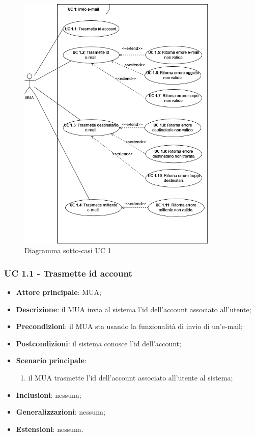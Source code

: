    \begin{figure}[H]
        \includegraphics[width=0.85\textwidth]{sections/uc_imgs/UC01.png}
        \centering
        \caption{Diagramma sotto-casi UC 1}
    \end{figure}

    \subsubsection{UC 1.1 - Trasmette id account} \label{sec:UC1.1}
    \begin{itemize}
        \item \textbf{Attore principale}: MUA;
        \item \textbf{Descrizione}: il MUA invia al sistema l'id dell'account associato all'utente;
        \item \textbf{Precondizioni}: il MUA sta usando la funzionalità di invio di un'e-mail;
        \item \textbf{Postcondizioni}: il sistema conosce l'id dell'account;
        \item \textbf{Scenario principale}:
            \begin{enumerate}
                \item il MUA trasmette l'id dell'account associato all'utente al sistema;
            \end{enumerate}
        \item \textbf{Inclusioni}: nessuna;
        \item \textbf{Generalizzazioni}: nessuna;
        \item \textbf{Estensioni}: nessuna.
    \end{itemize}

